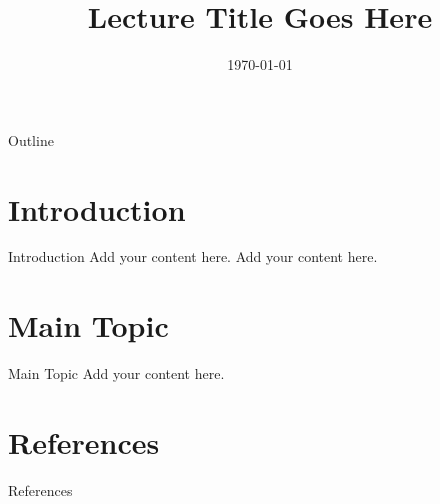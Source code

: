 \documentclass[beamer]{itvest}
\title{Lecture Title Goes Here}
\date{\today}
\begin{document}
\titleframe

\begin{frame}{Outline}
  \tableofcontents
\end{frame}

\section{Introduction}

\begin{frame}{Introduction}
  Add your content here.
  Add your content here.
\end{frame}

\section{Main Topic}

\begin{frame}{Main Topic}
  Add your content here.
\end{frame}



\section*{References}

\begin{frame}[allowframebreaks]{References}
  
  
\end{frame}
\end{document}
